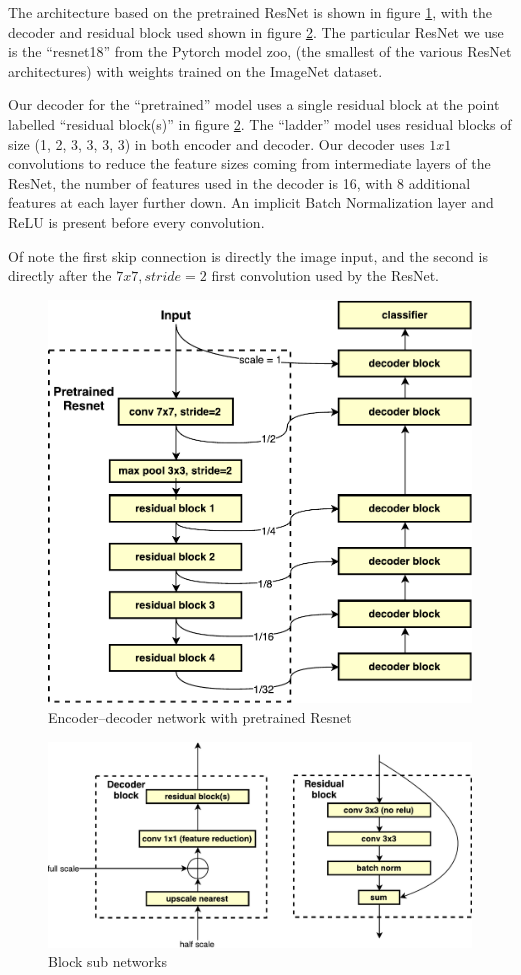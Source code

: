 \documentclass{article}
\begin{document}
The architecture based on the pretrained ResNet is shown in figure \ref{fig:network}, with the decoder and residual block used shown in figure \ref{fig:decode_block}. The particular ResNet we use is the ``resnet18'' from the Pytorch model zoo, (the smallest of the various ResNet architectures) with weights trained on the ImageNet dataset. 

Our decoder for the ``pretrained'' model uses a single residual block at the point labelled ``residual block(s)'' in figure \ref{fig:decode_block}. The ``ladder'' model uses residual blocks of size (1, 2, 3, 3, 3, 3) in both encoder and decoder. Our decoder uses $ 1x1 $ convolutions to reduce the feature sizes coming from intermediate layers of the ResNet, the number of features used in the decoder is 16, with 8 additional features at each layer further down. An implicit Batch Normalization layer and ReLU is present before every convolution.

Of note the first skip connection is directly the image input, and the second is directly after the $7x7, stride=2$ first convolution used by the ResNet.

\begin{figure}[t]
\centering
\includegraphics[width=0.9\linewidth]{images/network.pdf}
\caption{Encoder--decoder network with pretrained Resnet}  
\label{fig:network}
\end{figure}


\begin{figure}[t]
\centering
\includegraphics[width=0.9\linewidth]{images/network_blocks.pdf}
\caption{Block sub networks}  
\label{fig:decode_block}
\end{figure}
\end{document}
